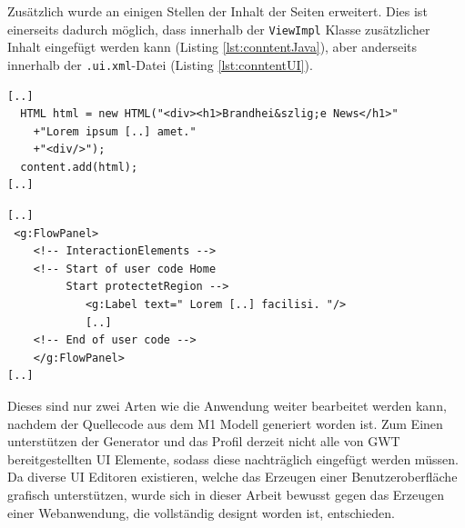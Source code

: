 Zusätzlich wurde an einigen Stellen der Inhalt der Seiten erweitert. Dies ist
einerseits dadurch möglich, dass innerhalb der \texttt{ViewImpl} Klasse
zusätzlicher Inhalt eingefügt werden kann (Listing \ref{lst:conntentJava}), aber
anderseits innerhalb der \texttt{.ui.xml}-Datei (Listing \ref{lst:conntentUI}).

\lstset{language=gwt}
\begin{lstlisting}[caption={Einfügen von Inhalten auf einer Seite durch
Veränderungen am Java-Code},
label={lst:conntentJava}] 
[..] 
  HTML html = new HTML("<div><h1>Brandhei&szlig;e News</h1>"
	+"Lorem ipsum [..] amet."
	+"<div/>");
  content.add(html);
[..]
\end{lstlisting}
\lstset{language=gwt}
\begin{lstlisting}[caption={Einfügen von Inhalten auf einer Seite durch
Veränderungen am \texttt{ui.xml}-Datei},
label={lst:conntentUI}] 
[..] 
 <g:FlowPanel>
	<!-- InteractionElements -->
	<!-- Start of user code Home 
	     Start protectetRegion -->
			<g:Label text=" Lorem [..] facilisi. "/>
			[..]		
	<!-- End of user code -->
	</g:FlowPanel>
[..]
\end{lstlisting}

Dieses sind nur zwei Arten wie die Anwendung weiter bearbeitet werden kann,
nachdem der Quellecode aus dem M1 Modell generiert worden ist. Zum Einen
unterstützen der Generator und das Profil derzeit nicht alle von GWT
bereitgestellten UI Elemente, sodass diese nachträglich eingefügt werden
müssen. Da diverse UI Editoren existieren, welche das Erzeugen einer
Benutzeroberfläche grafisch unterstützen, wurde sich in dieser Arbeit bewusst
gegen das Erzeugen einer Webanwendung, die vollständig designt worden ist,
entschieden. 
